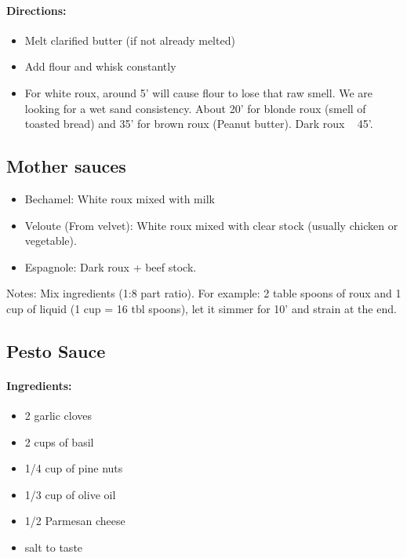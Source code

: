 \documentclass{article}
\begin{document}
\paragraph{Directions:}
\begin{itemize}
	\item Melt clarified butter (if not already melted)
	\item Add flour and whisk constantly
	\item For white roux, around 5' will cause flour to lose that raw smell. We are looking for a wet sand consistency. About 20' for blonde roux (smell of toasted bread) and 35' for brown roux (Peanut butter). Dark roux ~ 45'.
\end{itemize}

\subsection{Mother sauces}
\begin{itemize}
	\item Bechamel: White roux mixed with milk
	\item Veloute (From velvet): White roux mixed with clear stock (usually chicken or vegetable).
	\item Espagnole: Dark roux + beef stock.
\end{itemize}

Notes: Mix ingredients (1:8 part ratio). For example: 2 table spoons of roux and 1 cup of liquid (1 cup = 16 tbl spoons), let it simmer for 10' and strain at the end.

\subsection{Pesto Sauce}

\paragraph{Ingredients:}

\begin{itemize}
	\item 2 garlic cloves
	\item 2 cups of basil
	\item 1/4 cup of pine nuts
	\item 1/3 cup of olive oil
	\item 1/2 Parmesan cheese
	\item salt to taste
\end{itemize}
\end{document}
